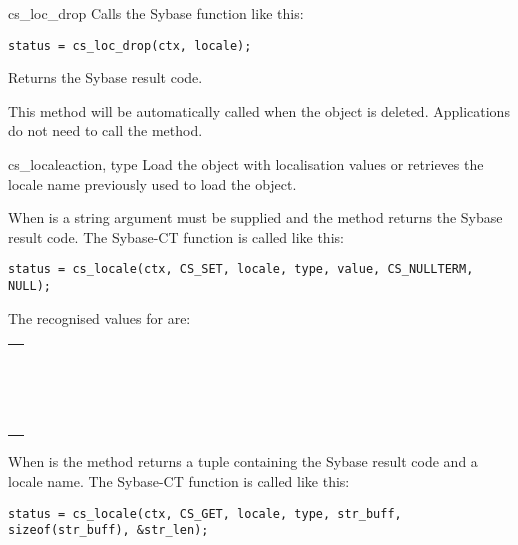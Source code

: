 \begin{methoddesc}[CS_LOCALE]{cs_loc_drop}{}
Calls the Sybase  function like this:

\begin{verbatim}
status = cs_loc_drop(ctx, locale);
\end{verbatim}

Returns the Sybase result code.

This method will be automatically called when the 
object is deleted.  Applications do not need to call the method.
\end{methoddesc}

\begin{methoddesc}[CS_LOCALE]{cs_locale}{action, type }
Load the object with localisation values or retrieves the locale name
previously used to load the object.

When  is  a string  argument
must be supplied and the method returns the Sybase result code.  The
Sybase-CT  function is called like this:

\begin{verbatim}
status = cs_locale(ctx, CS_SET, locale, type, value, CS_NULLTERM, NULL);
\end{verbatim}

The recognised values for  are:

\begin{longtable}{l}
\var{type} \\
\hline
\code{CS_LC_COLLATE}  \\
\code{CS_LC_CTYPE}    \\
\code{CS_LC_MESSAGE}  \\
\code{CS_LC_MONETARY} \\
\code{CS_LC_NUMERIC}  \\
\code{CS_LC_TIME}     \\
\code{CS_LC_ALL}      \\
\code{CS_SYB_LANG}    \\
\code{CS_SYB_CHARSET} \\
\code{CS_SYB_SORTORDER} \\
\code{CS_SYB_COLLATE}   \\
\code{CS_SYB_LANG_CHARSET} \\
\code{CS_SYB_TIME}     \\
\code{CS_SYB_MONETARY} \\
\code{CS_SYB_NUMERIC}  \\
\end{longtable}

When  is  the method returns a tuple
containing the Sybase result code and a locale name.  The
Sybase-CT  function is called like this:

\begin{verbatim}
status = cs_locale(ctx, CS_GET, locale, type, str_buff, sizeof(str_buff), &str_len);
\end{verbatim}
\end{methoddesc}

